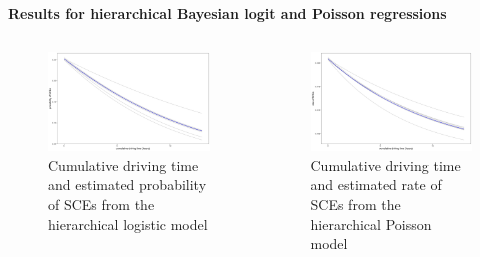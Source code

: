 \begin{frame}{\textbf{Results for hierarchical Bayesian logit and Poisson regressions}}
\begin{columns}
\begin{column}{.45\textwidth}
\begin{figure}
  \includegraphics[width=\textwidth]{Figures/fit_logit.png}
  \caption{Cumulative driving time and estimated probability of SCEs from the hierarchical logistic model}
\end{figure}
\end{column}
\hfill
\begin{column}{.45\textwidth}
\begin{figure}
  \includegraphics[width=\textwidth]{Figures/fit_Poisson.png}
  \caption{Cumulative driving time and estimated rate of SCEs from the hierarchical Poisson model}
\end{figure}
\end{column}
\end{columns}
\end{frame}

